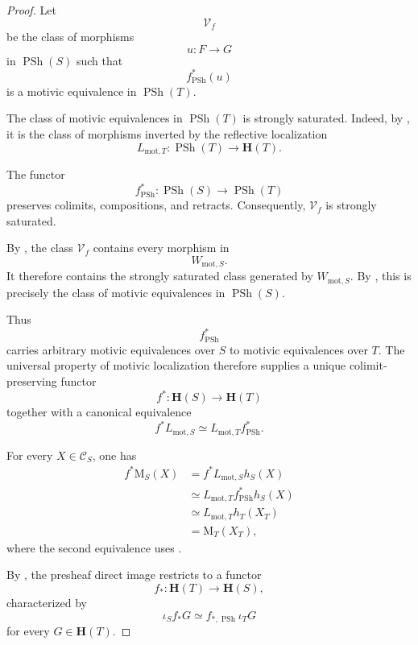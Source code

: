 \begin{proof}
Let
\[
    \mathcal V_f
\]
be the class of morphisms
\[
    u
    \colon
    F
    \longrightarrow
    G
\]
in \(\operatorname{PSh}(S)\) such that
\[
    f^*_{\operatorname{PSh}}(u)
\]
is a motivic equivalence in \(\operatorname{PSh}(T)\).

The class of motivic equivalences in
\(\operatorname{PSh}(T)\) is strongly saturated. Indeed, by
, it is the class of
morphisms inverted by the reflective localization
\[
    L_{\mathrm{mot},T}
    \colon
    \operatorname{PSh}(T)
    \longrightarrow
    \mathbf H(T).
\]

The functor
\[
    f^*_{\operatorname{PSh}}
    \colon
    \operatorname{PSh}(S)
    \longrightarrow
    \operatorname{PSh}(T)
\]
preserves colimits, compositions, and retracts. Consequently,
\(\mathcal V_f\) is strongly saturated.

By
,
the class \(\mathcal V_f\) contains every morphism in
\[
    W_{\mathrm{mot},S}.
\]
It therefore contains the strongly saturated class generated by
\(W_{\mathrm{mot},S}\). By
, this is precisely the class
of motivic equivalences in \(\operatorname{PSh}(S)\).

Thus
\[
    f^*_{\operatorname{PSh}}
\]
carries arbitrary motivic equivalences over \(S\) to motivic
equivalences over \(T\). The universal property of motivic localization
therefore supplies a unique colimit-preserving functor
\[
    f^*
    \colon
    \mathbf H(S)
    \longrightarrow
    \mathbf H(T)
\]
together with a canonical equivalence
\[
    f^*L_{\mathrm{mot},S}
    \simeq
    L_{\mathrm{mot},T}f^*_{\operatorname{PSh}}.
\]

For every \(X\in\mathcal C_S\), one has
\[
\begin{aligned}
    f^*\mathrm M_S(X)
    &=
    f^*L_{\mathrm{mot},S}h_S(X)
    \\
    &\simeq
    L_{\mathrm{mot},T}
    f^*_{\operatorname{PSh}}h_S(X)
    \\
    &\simeq
    L_{\mathrm{mot},T}h_T(X_T)
    \\
    &=
    \mathrm M_T(X_T),
\end{aligned}
\]
where the second equivalence uses
.

By
,
the presheaf direct image restricts to a functor
\[
    f_*
    \colon
    \mathbf H(T)
    \longrightarrow
    \mathbf H(S),
\]
characterized by
\[
    \iota_Sf_*G
    \simeq
    f_{*,\operatorname{PSh}}\iota_TG
\]
for every \(G\in\mathbf H(T)\).


\end{proof}
